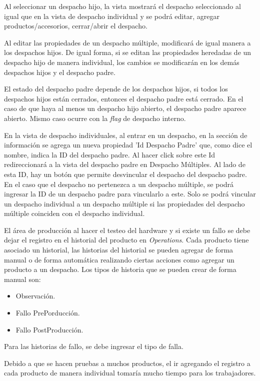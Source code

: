 Al seleccionar un despacho hijo, la vista mostrará el despacho seleccionado al igual que en la vista de despacho individual y se podrá editar, agregar productos/accesorios, cerrar/abrir el despacho.

Al editar las propiedades de un despacho múltiple, modificará de igual manera a los despachos hijos. De igual forma, si se editan las propiedades heredadas de un despacho hijo de manera individual, los cambios se modificarán en los demás despachos hijos y el despacho padre.

El estado del despacho padre depende de los despachos hijos, si todos los despachos hijos están cerrados, entonces el despacho padre está cerrado. En el caso de que haya al menos un despacho hijo abierto, el despacho padre aparece abierto. Mismo caso ocurre con la \textit{flag} de despacho interno.

En la vista de despacho individuales, al entrar en un despacho, en la sección de información se agrega un nueva propiedad 'Id Despacho Padre' que, como dice el nombre, indica la ID del despacho padre. Al hacer click sobre este Id redireccionará a la vista del despacho padre en Despacho Múltiples.
Al lado de esta ID, hay un botón que permite desvincular el despacho del despacho padre. 
En el caso que el despacho no pertenezca a un despacho múltiple, se podrá ingresar la ID de un despacho padre para vincularlo a este. Solo se podrá vincular un despacho individual a un despacho múltiple si las propiedades del despacho múltiple coinciden con el despacho individual.


El área de producción al hacer el testeo del hardware y si existe un fallo se debe dejar el registro en el historial del producto en \textit{Operations}.
Cada producto tiene asociado un historial, las historias del historial se pueden agregar de forma manual o de forma automática realizando ciertas acciones como agregar un producto a un despacho.
Los tipos de historia que se pueden crear de forma manual son:
\begin{itemize}
    \item Observación.
    \item Fallo PrePorducción.
    \item Fallo PostProducción.
\end{itemize}

Para las historias de fallo, se debe ingresar el tipo de falla.

Debido a que se hacen pruebas a muchos productos, el ir agregando el registro a cada producto de manera individual tomaría mucho tiempo para los trabajadores.

